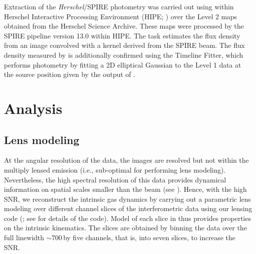 \documentclass[]{emulateapj}
\begin{document}
Extraction of the {\it Herschel}/SPIRE photometry was
carried out using  within Herschel Interactive
Processing Environment (HIPE; \citealt{Ott10a})
over the Level 2 maps obtained from the Herschel Science Archive.
These maps were processed by the SPIRE pipeline
version 13.0 within HIPE. The  task estimates
the flux density from an image convolved with a kernel
derived from the SPIRE beam. The flux density
measured by  is additionally confirmed
using the Timeline Fitter, which performs photometry
by fitting a 2D elliptical Gaussian to the Level 1 data at the
source position given by the output of .



\section{Analysis}
\subsection{Lens modeling} \label{sec:lensmodel} %
At the angular resolution of the \bco data, the images are resolved
but not within the multiply lensed emission (i.e., sub-optimal for
performing lens modeling). Nevertheless, the high spectral
resolution of this data provides dynamical information on
spatial scales smaller than the beam (see ).
Hence, with the high SNR, we reconstruct the intrinsic gas
dynamics by carrying out a parametric lens modeling over different
channel slices of the interferometric data using our lensing code
\uvmcmcfit (\citealt{uvmcmcfit15a}; see \citealt{Bussmann15a} for details of
the code). Model of each slice in  thus provides
properties on the intrinsic kinematics. The slices
are obtained by binning the data over the full linewidth
$\sim$700\,\kms by five channels,
that is, into seven slices, to increase the SNR.
\end{document}
